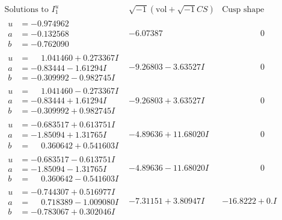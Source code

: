 \documentclass[1p]{elsarticle_modified}
\theoremstyle{definition}
\newcommand{\I}{\sqrt{-1}}
\begin{document}
$$\begin{array}{c|c|c}  
\text{Solutions to }I^u_{1}& \I (\text{vol} + \sqrt{-1}CS) & \text{Cusp shape}\\
 \hline 
\begin{aligned}
u &= -0.974962\phantom{ +0.000000I} \\
a &= -0.132568\phantom{ +0.000000I} \\
b &= -0.762090\phantom{ +0.000000I}\end{aligned}
 & -6.07387\phantom{ +0.000000I} & \phantom{-0.000000 } 0 \\ \hline\begin{aligned}
u &= \phantom{-}1.041460 + 0.273367 I \\
a &= -0.83444 - 1.61294 I \\
b &= -0.309992 - 0.982745 I\end{aligned}
 & -9.26803 - 3.63527 I & \phantom{-0.000000 } 0 \\ \hline\begin{aligned}
u &= \phantom{-}1.041460 - 0.273367 I \\
a &= -0.83444 + 1.61294 I \\
b &= -0.309992 + 0.982745 I\end{aligned}
 & -9.26803 + 3.63527 I & \phantom{-0.000000 } 0 \\ \hline\begin{aligned}
u &= -0.683517 + 0.613751 I \\
a &= -1.85094 + 1.31765 I \\
b &= \phantom{-}0.360642 + 0.541603 I\end{aligned}
 & -4.89636 + 11.68020 I & \phantom{-0.000000 } 0 \\ \hline\begin{aligned}
u &= -0.683517 - 0.613751 I \\
a &= -1.85094 - 1.31765 I \\
b &= \phantom{-}0.360642 - 0.541603 I\end{aligned}
 & -4.89636 - 11.68020 I & \phantom{-0.000000 } 0 \\ \hline\begin{aligned}
u &= -0.744307 + 0.516977 I \\
a &= \phantom{-}0.718389 - 1.009080 I \\
b &= -0.783067 + 0.302046 I\end{aligned}
 & -7.31151 + 3.80947 I & -16.8222 + 0. I\phantom{ +0.000000I} \\ \hline\begin{aligned}

\end{aligned}
\end{array}$$
\end{document}
